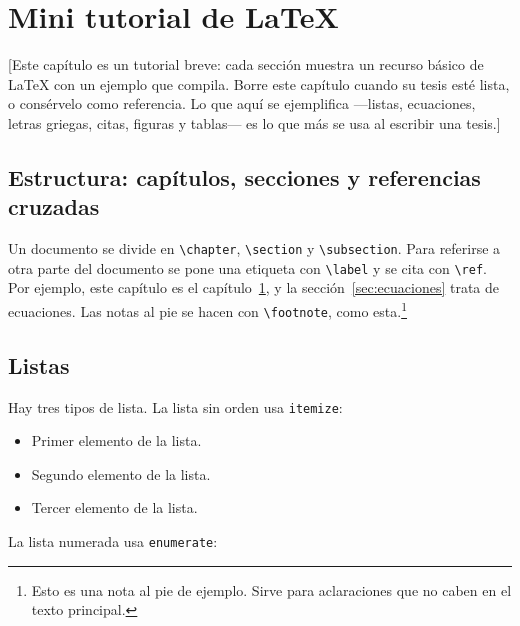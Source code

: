 \chapter{Mini tutorial de LaTeX}\label{ChapTutorial}

[Este capítulo es un tutorial breve: cada sección muestra un recurso
básico de LaTeX con un ejemplo que compila. Borre este capítulo cuando su
tesis esté lista, o consérvelo como referencia. Lo que aquí se ejemplifica
—listas, ecuaciones, letras griegas, citas, figuras y tablas— es lo que
más se usa al escribir una tesis.]

\section{Estructura: capítulos, secciones y referencias cruzadas}

Un documento se divide en \verb|\chapter|, \verb|\section| y
\verb|\subsection|. Para referirse a otra parte del documento se pone una
etiqueta con \verb|\label| y se cita con \verb|\ref|. Por ejemplo, este
capítulo es el capítulo~\ref{ChapTutorial}, y la
sección~\ref{sec:ecuaciones} trata de ecuaciones. Las notas al pie se
hacen con \verb|\footnote|, como esta.\footnote{Esto es una nota al pie
de ejemplo. Sirve para aclaraciones que no caben en el texto principal.}

\section{Listas}

Hay tres tipos de lista. La lista sin orden usa \verb|itemize|:

\begin{itemize}
\item Primer elemento de la lista.
\item Segundo elemento de la lista.
\item Tercer elemento de la lista.
\end{itemize}

La lista numerada usa \verb|enumerate|:

